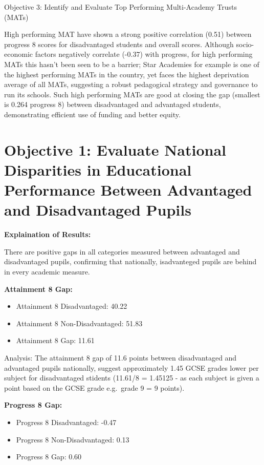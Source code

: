 \documentclass[
  letterpaper,
  DIV=11,
  numbers=noendperiod]{scrartcl}
\begin{document}
Objective 3: Identify and Evaluate Top Performing Multi-Academy Trusts
(MATs)

High performing MAT have shown a strong positive correlation (0.51)
between progress 8 scores for disadvantaged students and overall scores.
Although socio-economic factors negatively correlate (-0.37) with
progress, for high performing MATs this hasn't been seen to be a
barrier; Star Academies for example is one of the highest performing
MATs in the country, yet faces the highest deprivation average of all
MATs, suggesting a robust pedagogical strategy and governance to run its
schools. Such high performing MATs are good at closing the gap (smallest
is 0.264 progress 8) between disadvantaged and advantaged students,
demonstrating efficient use of funding and better equity.

\section{Objective 1: Evaluate National Disparities in Educational
Performance Between Advantaged and Disadvantaged
Pupils}\label{objective-1-evaluate-national-disparities-in-educational-performance-between-advantaged-and-disadvantaged-pupils}

\textbf{Explaination of Results:}

There are positive gaps in all categories measured between advantaged
and disadvantaged pupils, confirming that nationally, isadvanteged
pupils are behind in every academic measure.

\textbf{Attainment 8 Gap:}

\begin{itemize}
\item
  Attainment 8 Disadvantaged: 40.22
\item
  Attainment 8 Non-Disadvantaged: 51.83
\item
  Attainment 8 Gap: 11.61
\end{itemize}

Analysis: The attainment 8 gap of 11.6 points between disadvantaged and
advantaged pupils nationally, suggest approximately 1.45 GCSE grades
lower per subject for disadvantaged stidents (11.61/8 = 1.45125 - as
each subject is given a point based on the GCSE grade e.g.~grade 9 = 9
points).

\textbf{Progress 8 Gap:}

\begin{itemize}
\item
  Progress 8 Disadvantaged: -0.47
\item
  Progress 8 Non-Disadvantaged: 0.13
\item
  Progress 8 Gap: 0.60
\end{itemize}
\end{document}
